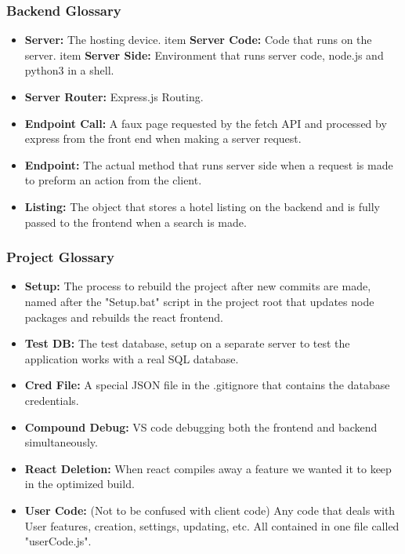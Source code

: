 \documentclass[]{article}
\begin{document}
\subsubsection{Backend Glossary}
\begin{itemize}
    \item \textbf{Server:} The hosting device. 
    item \textbf{Server Code:} Code that runs on the server.
    item \textbf{Server Side:} Environment that runs server code, node.js and python3 in a shell. 
    \item \textbf{Server Router:} Express.js Routing.
    \item \textbf{Endpoint Call:} A faux page requested by the fetch API and processed by express from the front end when making a server request. 
    \item \textbf{Endpoint:} The actual method that runs server side when a request is made to preform an action from the client. 
    \item \textbf{Listing:} The object that stores a hotel listing on the backend and is fully passed to the frontend when a search is made.
\end{itemize}

\subsubsection{Project Glossary}
\begin{itemize}
    \item \textbf{Setup:} The process to rebuild the project after new commits are made, named after the "Setup.bat" script in the project root that updates node packages and rebuilds the react frontend.
    \item \textbf{Test DB:} The test database, setup on a separate server to test the application works with a real SQL database. 
    \item \textbf{Cred File:} A special JSON file in the .gitignore that contains the database credentials. 
    \item \textbf{Compound Debug:} VS code debugging both the frontend and backend simultaneously. 
    \item \textbf{React Deletion:} When react compiles away a feature we wanted it to keep in the optimized build. 
    \item \textbf{User Code:} (Not to be confused with client code) Any code that deals with User features, creation, settings, updating, etc. All contained in one file called "userCode.js".
\end{itemize}
\end{document}
